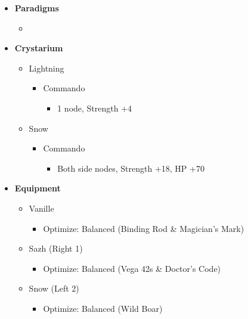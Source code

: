 \begin{paracol}{2}
	\renewcommand{\third}{[3] Aggression (\com/\com/\rav)}

	\renewcommand{\fourth}{[4] Aggression (\com/\com/\rav)}
	\switchcolumn
\begin{menu}
\begin{itemize}
    \item \textbf{Paradigms}
    \begin{itemize}
        \item {}%
{\paradigmline{(\rav)}{\rav}{\rav}}%
{\paradigmline{\com}{\sen}{\med}}%
{\paradigmline[3]{\textit{[\com]}}{\textit{\com}}{\textit{\rav}}}%
{\paradigmline{[\com]}{\com}{\rav}}
    \end{itemize}
    \item \textbf{Crystarium}
    \begin{itemize}
        \item Lightning
        \begin{itemize}
            \item Commando
            \begin{itemize}
                \item 1 node, Strength +4
            \end{itemize}
        \end{itemize}
        \item Snow
        \begin{itemize}
            \item Commando
            \begin{itemize}
                \item Both side nodes, Strength +18, HP +70
            \end{itemize}
        \end{itemize}
    \end{itemize}
    
    \item \textbf{Equipment}
    \begin{itemize}
        \item Vanille
        \begin{itemize}
            \item Optimize: Balanced (Binding Rod \& Magician's Mark)
        \end{itemize}
        \item Sazh (Right 1)
        \begin{itemize}
            \item Optimize: Balanced (Vega 42s \& Doctor's Code)
        \end{itemize}
        \item Snow (Left 2)
        \begin{itemize}
            \item Optimize: Balanced (Wild Boar)
        \end{itemize}
    \end{itemize}
\end{itemize}
\end{menu}


\end{paracol}
